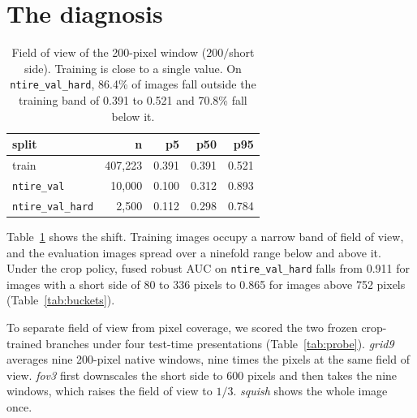 \documentclass[10pt,twocolumn,letterpaper]{article}
\begin{document}
\section{The diagnosis}
\label{sec:diagnosis}

\begin{table}[t]
\centering
\small
\begin{tabular}{lrrrr}
\toprule
split & n & p5 & p50 & p95 \\
\midrule
train & 407,223 & 0.391 & 0.391 & 0.521 \\
\texttt{ntire\_val} & 10,000 & 0.100 & 0.312 & 0.893 \\
\texttt{ntire\_val\_hard} & 2,500 & 0.112 & 0.298 & 0.784 \\
\bottomrule
\end{tabular}
\caption{Field of view of the 200-pixel window ($200/$short side). Training
is close to a single value. On \texttt{ntire\_val\_hard}, 86.4\% of images
fall outside the training band of 0.391 to 0.521 and 70.8\% fall below it.}
\label{tab:fov}
\end{table}

Table~\ref{tab:fov} shows the shift. Training images occupy a narrow band of
field of view, and the evaluation images spread over a ninefold range below
and above it. Under the crop policy, fused robust AUC on
\texttt{ntire\_val\_hard} falls from 0.911 for images with a short side of 80
to 336 pixels to 0.865 for images above 752 pixels (Table~\ref{tab:buckets}).

To separate field of view from pixel coverage, we scored the two frozen
crop-trained branches under four test-time presentations
(Table~\ref{tab:probe}). \emph{grid9} averages nine 200-pixel native windows,
nine times the pixels at the same field of view. \emph{fov3} first downscales
the short side to 600 pixels and then takes the nine windows, which raises the
field of view to $1/3$. \emph{squish} shows the whole image once.
\end{document}
